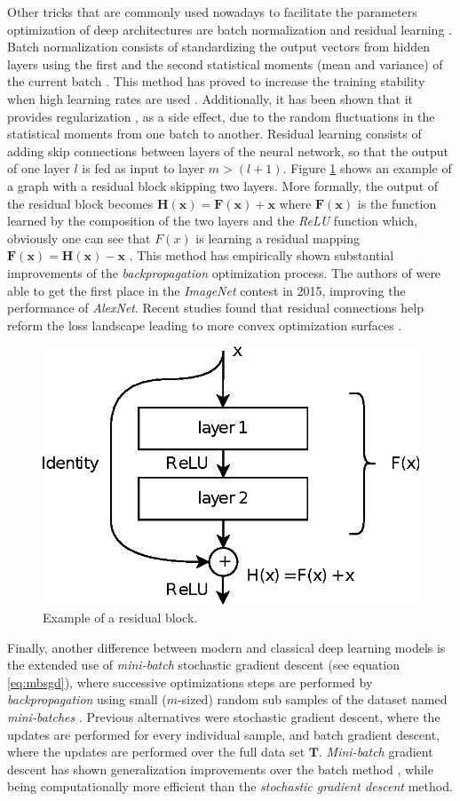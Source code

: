 Other tricks that are commonly used nowadays to facilitate the parameters optimization of deep architectures are batch normalization \cite{ioffe2015} and residual learning \cite{kaiming2016}. Batch normalization consists of standardizing the output vectors from hidden layers using the first and the second statistical moments (mean and variance) of the current batch \cite{ioffe2015}. This method has proved to increase the training stability when high learning rates are used \cite{Goodfellow2016}. Additionally, it has been shown that it provides regularization \cite{dauphin2021}, as a side effect, due to the random fluctuations in the statistical moments from one batch to another. Residual learning consists of adding skip connections between layers of the neural network, so that the output of one layer $l$ is fed as input to layer $m > (l+1)$. Figure \ref{fig:residual} shows an example of a graph with a residual block skipping two layers. More formally, the output of the residual block becomes $\mathbf{H(x)} = \mathbf{F(x)} + \mathbf{x}$ where $\mathbf{F(x)}$ is the function learned by the composition of the two layers and the \textit{ReLU} function which, obviously one can see that $F(x)$ is learning a residual mapping $\mathbf{F(x)} = \mathbf{H(x)} - \mathbf{x}$ \cite{kaiming2016}. This method has empirically shown substantial improvements of the \textit{backpropagation} optimization process. The authors of \cite{kaiming2016} were able to get the first place in the \textit{ImageNet} contest in 2015, improving the performance of \textit{AlexNet}. Recent studies found that residual connections help reform the loss landscape leading to more convex optimization surfaces \cite{freeman2017, wang2020}.


\begin{figure}
	\centering
	\includegraphics[width=0.5\linewidth]{chapter2/images/residual}
	\caption{Example of a residual block.}
	\label{fig:residual}
\end{figure}


Finally, another difference between modern and classical deep learning models is the extended use of \textit{mini-batch} stochastic gradient descent (see equation \ref{eq:mbsgd}), where successive optimizations steps are performed by \textit{backpropagation} using small ($m$-sized) random sub samples of the dataset named \textit{mini-batches} \cite{ruder2016}. Previous alternatives were stochastic gradient descent, where the updates are performed for every individual sample, and batch gradient descent, where the updates are performed over the full data set $\mathbf{T}$. \textit{Mini-batch} gradient descent has shown generalization improvements over the batch method \cite{Hoffer2017}, while being computationally more efficient than the \textit{stochastic gradient descent} method.
	

